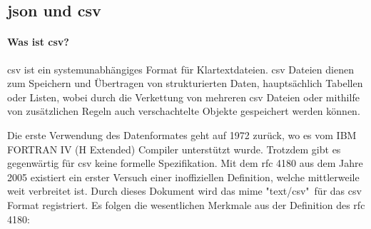 \subsection{\acs{json} und \acs{csv}}
\paragraph{Was ist \acs{csv}?}
\acf{csv} ist ein systemunabhängiges Format für Klartextdateien. \acs{csv} Dateien dienen zum Speichern und Übertragen von strukturierten Daten, hauptsächlich Tabellen oder Listen, wobei durch die Verkettung von mehreren \acs{csv} Dateien oder mithilfe von zusätzlichen Regeln auch verschachtelte Objekte gespeichert werden können. \cite{FuchsMediaSolutions:o.J.}

Die erste Verwendung des Datenformates geht auf 1972 zurück, wo es vom IBM FORTRAN IV (H Extended) Compiler \cite{IBM:1972} unterstützt wurde. Trotzdem gibt es gegenwärtig für \acs{csv} keine formelle Spezifikation. Mit dem \acs{rfc} 4180 \cite{Shafranovich:2005} aus dem Jahre 2005 existiert ein erster Versuch einer inoffiziellen Definition, welche mittlerweile weit verbreitet ist. Durch dieses Dokument wird das \acf{mime} "text/csv"\ für das \acs{csv} Format registriert. Es folgen die wesentlichen Merkmale aus der Definition des \acs{rfc} 4180:

